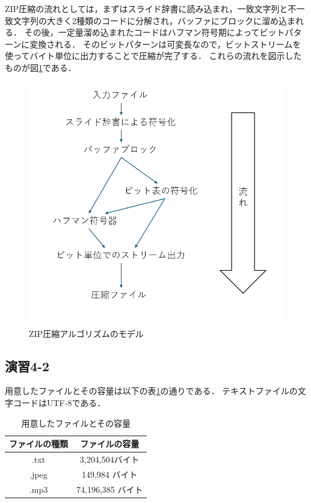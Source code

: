 \documentclass[documentclass]{jsarticle}
\begin{document}
ZIP圧縮の流れとしては，まずはスライド辞書に読み込まれ，一致文字列と不一致文字列の大きく2種類のコードに分解され，バッファにブロックに溜め込まれる．
その後，一定量溜め込まれたコードはハフマン符号期によってビットパターンに変換される．
そのビットパターンは可変長なので，ビットストリームを使ってバイト単位に出力することで圧縮が完了する．
これらの流れを図示したものが図\ref*{fig:4-1}である．
\begin{figure}[H]
  \begin{center}
    \includegraphics*[scale=0.5]{figure/4-1.png}
  \end{center}
  \caption{ZIP圧縮アルゴリズムのモデル}
  \label{fig:4-1}
\end{figure}

\subsection*{演習4-2}
用意したファイルとその容量は以下の表\ref*{tb:4-1}の通りである．
テキストファイルの文字コードはUTF-8である．
\begin{table}[H]
  \begin{center}
    \caption{用意したファイルとその容量}
    \label{tb:4-1}
    \begin{tabular}{|cc|} \hline
     ファイルの種類 & ファイルの容量 \\ \hline
     .txt    & 3,204,504バイト \\
     .jpeg   & 149,984 バイト \\
     .mp3    & 74,196,385 バイト \\ \hline
    \end{tabular}
  \end{center}
\end{table}
\end{document}
